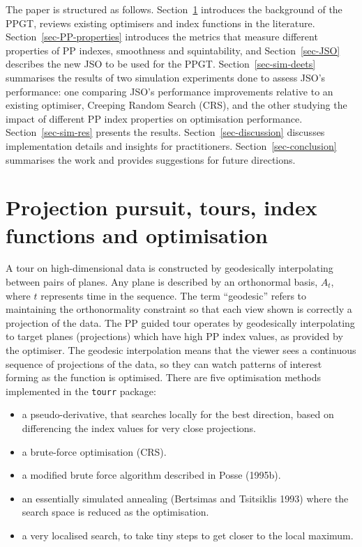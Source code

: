 \documentclass[
  12pt,
]{interact}
\providecommand{\tightlist}{%
  \setlength{\itemsep}{0pt}\setlength{\parskip}{0pt}}\usepackage{longtable,booktabs,array}
\theoremstyle{plain}
\begin{document}
The paper is structured as follows. Section~\ref{sec-background}
introduces the background of the PPGT, reviews existing optimisers and
index functions in the literature. Section~\ref{sec-PP-properties}
introduces the metrics that measure different properties of PP indexes,
smoothness and squintability, and Section~\ref{sec-JSO} describes the
new JSO to be used for the PPGT. Section~\ref{sec-sim-deets} summarises
the results of two simulation experiments done to assess JSO's
performance: one comparing JSO's performance improvements relative to an
existing optimiser, Creeping Random Search (CRS), and the other studying
the impact of different PP index properties on optimisation performance.
Section~\ref{sec-sim-res} presents the results.
Section~\ref{sec-discussion} discusses implementation details and
insights for practitioners. Section~\ref{sec-conclusion} summarises the
work and provides suggestions for future directions.

\section{Projection pursuit, tours, index functions and
optimisation}\label{sec-background}

A tour on high-dimensional data is constructed by geodesically
interpolating between pairs of planes. Any plane is described by an
orthonormal basis, \(A_t\), where \(t\) represents time in the sequence.
The term ``geodesic'' refers to maintaining the orthonormality
constraint so that each view shown is correctly a projection of the
data. The PP guided tour operates by geodesically interpolating to
target planes (projections) which have high PP index values, as provided
by the optimiser. The geodesic interpolation means that the viewer sees
a continuous sequence of projections of the data, so they can watch
patterns of interest forming as the function is optimised. There are
five optimisation methods implemented in the \texttt{tourr} package:

\begin{itemize}
\tightlist
\item
  a pseudo-derivative, that searches locally for the best direction,
  based on differencing the index values for very close projections.
\item
  a brute-force optimisation (CRS).
\item
  a modified brute force algorithm described in Posse (1995b).
\item
  an essentially simulated annealing (Bertsimas and Tsitsiklis 1993)
  where the search space is reduced as the optimisation.
\item
  a very localised search, to take tiny steps to get closer to the local
  maximum.
\end{itemize}
\end{document}
